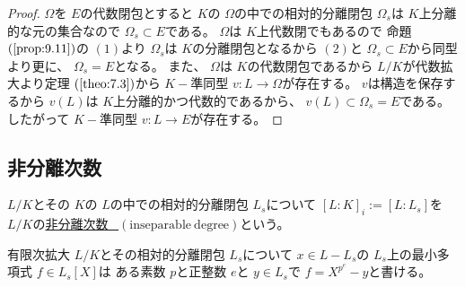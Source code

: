 \documentclass[../master_galois_theory]{subfiles}
\begin{document}
\begin{proof}
  $\Omega$を $E$の代数閉包とすると
  $K$の $\Omega$の中での相対的分離閉包 $\Omega_s$は
  $K$上分離的な元の集合なので $\Omega_s \subset E$である。
  $\Omega$は $K$上代数閉でもあるので
  命題 $(\mathrm{\ref{prop:9.11}})$の $(1)$より
  $\Omega_s$は $K$の分離閉包となるから $(2)$と
  $\Omega_s \subset E$から同型より更に、
  $\Omega_s = E$となる。
  また、 $\Omega$は $K$の代数閉包であるから
  $L/K$が代数拡大より定理 $(\mathrm{\ref{theo:7.3}})$から
  $K-$準同型 $v:L \longrightarrow \Omega$が存在する。
  $v$は構造を保存するから $v(L)$は $K$上分離的かつ代数的であるから、
  $v(L) \subset \Omega_s = E$である。
  したがって $K-$準同型 $v:L \longrightarrow E$が存在する。
\end{proof}

\subsection{非分離次数}

\begin{defi}
  $L/K$とその $K$の $L$の中での相対的分離閉包 $L_s$について
  $[L:K]_i := [L:L_s]$を $L/K$の\underline{非分離次数 \  $(\mathrm{inseparable \  degree})$}という。
\end{defi}

\begin{lemm} \label{lemm:bunriminimalpolynomial}
  有限次拡大 $L/K$とその相対的分離閉包 $L_s$について
  $x \in L - L_s$の $L_s$上の最小多項式 $f \in L_s[X]$は
  ある素数 $p$と正整数 $e$と $y \in L_s$で
  $f = X^{p^e} - y$と書ける。
\end{lemm}
\end{document}
